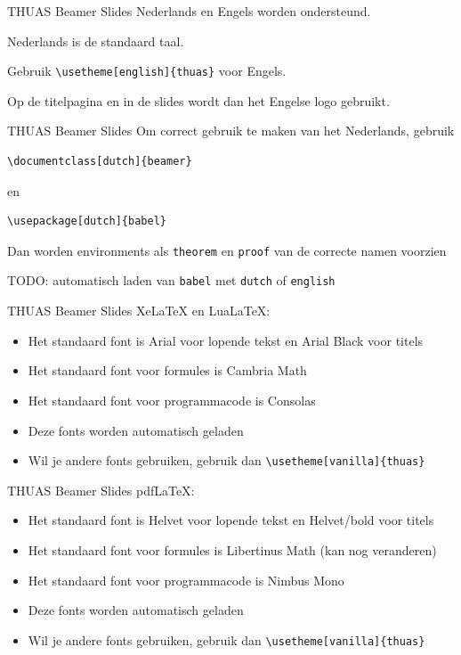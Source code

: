 \documentclass[fleqn,aspectratio=169,dutch]{beamer}
\begin{document}
\begin{frame}[fragile]{THUAS Beamer Slides}
Nederlands en Engels worden ondersteund.

Nederlands is de standaard taal.

Gebruik \lstinline|\usetheme[english]{thuas}| voor Engels.

Op de titelpagina en in de slides wordt dan het Engelse logo gebruikt.
\end{frame}

\begin{frame}[fragile]{THUAS Beamer Slides}
Om correct gebruik te maken van het Nederlands, gebruik
\begin{lstlisting}
\documentclass[dutch]{beamer}
\end{lstlisting}
en
\begin{lstlisting}
\usepackage[dutch]{babel}
\end{lstlisting}
Dan worden environments als \lstinline|theorem| en \lstinline|proof| van de correcte namen voorzien

\alert{TODO}: automatisch laden van \lstinline|babel| met \lstinline|dutch| of \lstinline|english|
\end{frame}

\begin{frame}[fragile]{THUAS Beamer Slides}
Xe\LaTeX{} en Lua\LaTeX:
\begin{itemize}
\item Het standaard font is Arial voor lopende tekst en Arial Black voor titels
\item Het standaard font voor formules is Cambria Math
\item Het standaard font voor programmacode is Consolas
\item Deze fonts worden automatisch geladen
\item Wil je andere fonts gebruiken, gebruik dan \lstinline|\usetheme[vanilla]{thuas}|
\end{itemize}
\end{frame}

\begin{frame}[fragile]{THUAS Beamer Slides}
pdf\LaTeX{}:
\begin{itemize}
\item Het standaard font is Helvet voor lopende tekst en Helvet/bold voor titels
\item Het standaard font voor formules is Libertinus Math (\alert{kan nog veranderen})
\item Het standaard font voor programmacode is Nimbus Mono
\item Deze fonts worden automatisch geladen
\item Wil je andere fonts gebruiken, gebruik dan \lstinline|\usetheme[vanilla]{thuas}|
\end{itemize}
\end{frame}
\end{document}
